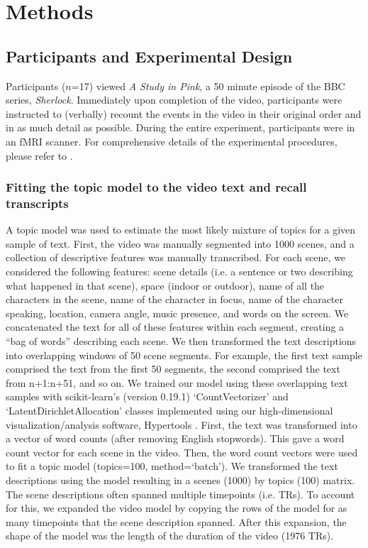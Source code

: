 \documentclass{article}
\begin{document}
{\section{Methods}
\label{sec:methods}

\subsection{Participants and Experimental Design}
Participants ($n$=17) viewed \textit{A Study in Pink}, a 50 minute episode of the BBC series, \textit{Sherlock}. Immediately upon completion of the video, participants were instructed to (verbally) recount the events in the video in their original order and in as much detail as possible. During the entire experiment, participants were in an fMRI scanner. For comprehensive details of the experimental procedures, please refer to \cite{ChenEtal17}.

\subsubsection{Fitting the topic model to the video text and recall transcripts}
A topic model was used to estimate the most likely mixture of topics for a given sample of text. First, the video was manually segmented into 1000 scenes, and a collection of descriptive features was manually transcribed. For each scene, we considered the following features: scene details (i.e. a sentence or two describing what happened in that scene), space (indoor or outdoor), name of all the characters in the scene, name of the character in focus, name of the character speaking, location, camera angle, music presence, and words on the screen. We concatenated the text for all of these features within each segment, creating a ``bag of words'' describing each scene. We then transformed the text descriptions into overlapping windows of 50 scene segments. For example, the first text sample comprised the text from the first 50 segments, the second comprised the text from n+1:n+51, and so on. We trained our model using these overlapping text samples with scikit-learn's (version 0.19.1) `CountVectorizer' and `LatentDirichletAllocation' classes \citep{PedrEtal11} implemented using our high-dimensional visualization/analysis software, Hypertools \citep{HeusEtal17a}.  First, the text was transformed into a vector of word counts (after removing English stopwords). This gave a word count vector for each scene in the video.  Then, the word count vectors were used to fit a topic model (topics=100, method=`batch'). We transformed the text descriptions using the model resulting in a scenes (1000) by topics (100) matrix. The scene descriptions often spanned multiple timepoints (i.e. TRs). To account for this, we expanded the video model by copying the rows of the model for as many timepoints that the scene description spanned. After this expansion, the shape of the model was the length of the duration of the video (1976 TRs).

}
\end{document}
